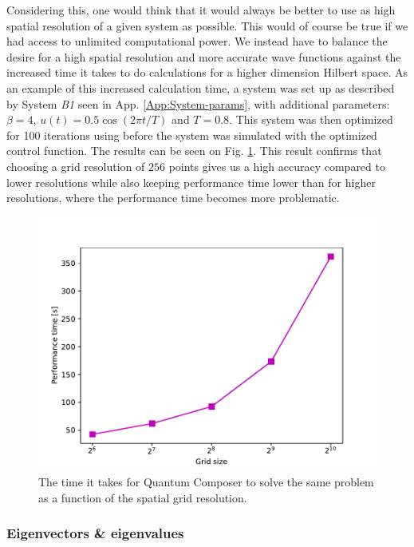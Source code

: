 \documentclass[a4paper, twocolumn]{revtex4-1}
\begin{document}
Considering this, one would think that it would always be better to use as high spatial resolution of a given system as possible. This would of course be true if we had access to unlimited computational power. We instead have to balance the desire for a high spatial resolution and more accurate wave functions against the increased time it takes to do calculations for a higher dimension Hilbert space. As an example of this increased calculation time, a system was set up as described by System \textit{B1} seen in App. \ref{App:System-params}, with additional parameters: $\beta = 4$, $u(t)=0.5 \cos(2\pi t/T)$ and $T=0.8$. This system was then optimized for 100 iterations using  before the system was simulated with the optimized control function. The results can be seen on Fig. \ref{fig:performanceTime}. This result confirms that choosing a grid resolution of $256$ points gives us a high accuracy compared to lower resolutions while also keeping performance time lower than for higher resolutions, where the performance time becomes more problematic.

\begin{figure}
	\includegraphics[width=\columnwidth]{graphics/stateAnalysis/PerformanceTime.pdf}
	\caption{The time it takes for Quantum Composer to solve the same problem as a function of the spatial grid resolution.}
	\label{fig:performanceTime}
\end{figure}

\subsubsection{Eigenvectors \& eigenvalues}
\end{document}
